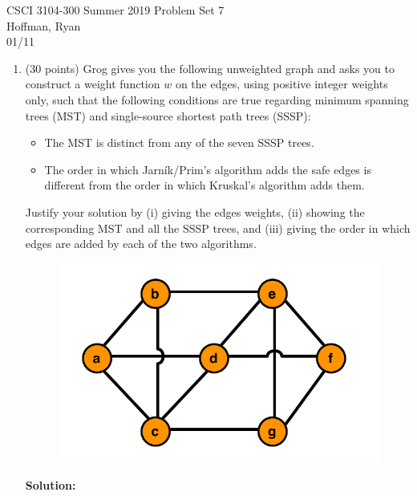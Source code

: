 \documentclass{article}
\begin{document}
CSCI 3104-300 Summer 2019 \hfill Problem Set 7 \\
Hoffman, Ryan \\
01/11

\hrulefill

\vspace{-3mm}
\begin{enumerate}
    \item (30 points) Grog gives you the following unweighted graph and asks you to construct a weight function $w$ on the edges, 
    using positive integer weights only, such that the following conditions are true regarding minimum spanning trees (MST) and 
    single-source shortest path trees (SSSP):
	    \begin{itemize}
	        \itemsep-0.1pt
	        \item The MST is distinct from any of the seven SSSP trees.
	        \item The order in which Jarn\'ik/Prim's algorithm adds the safe edges is different from the order in which Kruskal's algorithm adds them.
	    \end{itemize}
    Justify your solution by (i) giving the edges weights, (ii) showing the corresponding MST and all the SSSP trees, and 
    (iii) giving the order in which edges are added by each of the two algorithms.
    \begin{figure}[h!]
    \begin{center}
    \includegraphics[scale=0.7]{unweighted_graph.png} 
    \end{center}
    \end{figure}
    \par
    \pagebreak
    \textbf{Solution:}\par

\end{enumerate}
\end{document}
